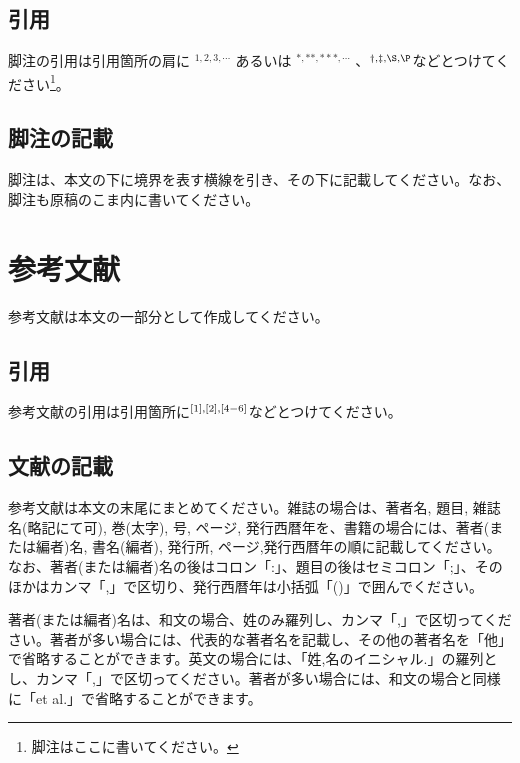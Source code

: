 \documentclass{hissymp}
\begin{document}
\subsection{引用}
脚注の引用は引用箇所の肩に $^ {1,2,3, \cdots} $ あるいは $^ {*,**,***,\cdots} $ 、$^ {\dag, \ddag, \S, \P} $などとつけてください\footnote{脚注はここに書いてください。}。

\subsection{脚注の記載}
脚注は、本文の下に境界を表す横線を引き、その下に記載してください。なお、脚注も原稿のこま内に書いてください。


\section{参考文献}
参考文献は本文の一部分として作成してください。

\subsection{引用}
参考文献の引用は引用箇所に$^ {\scriptsize [1],[2],[4-6]} $などとつけてください。

\subsection{文献の記載}
参考文献は本文の末尾にまとめてください。雑誌の場合は、著者名, 題目, 雑誌名(略記にて可), 巻(太字), 号, ページ, 発行西暦年を、書籍の場合には、著者(または編者)名, 書名(編者), 発行所, ページ,発行西暦年の順に記載してください。なお、著者(または編者)名の後はコロン「:」、題目の後はセミコロン「;」、そのほかはカンマ「,」で区切り、発行西暦年は小括弧「()」で囲んでください。

著者(または編者)名は、和文の場合、姓のみ羅列し、カンマ「,」で区切ってください。著者が多い場合には、代表的な著者名を記載し、その他の著者名を「他」で省略することができます。英文の場合には、「姓,名のイニシャル.」の羅列とし、カンマ「,」で区切ってください。著者が多い場合には、和文の場合と同様に「et al.」で省略することができます。\\
\end{document}
